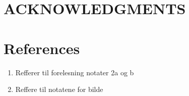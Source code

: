 \documentclass[reprint,english,notitlepage]{revtex4-2}
\begin{document}
\section*{ACKNOWLEDGMENTS}

\section*{References} \label{sec: references}
\begin{enumerate}
  \item Refferer til forelesning notater 2a og b
  \item Reffere til notatene for bilde \label{ref: Example worldline}
\end{enumerate}
\end{document}
